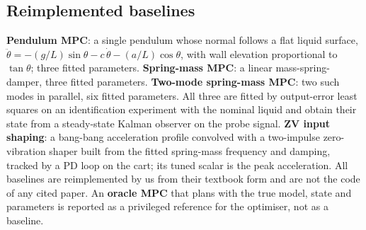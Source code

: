 \subsection{Reimplemented baselines}
\textbf{Pendulum MPC}: a single pendulum whose normal follows a flat liquid surface, $\ddot\theta=-(g/L)\sin\theta-c\,\dot\theta-(a/L)\cos\theta$, with wall elevation proportional to $\tan\theta$; three fitted parameters. \textbf{Spring-mass MPC}: a linear mass-spring-damper, three fitted parameters. \textbf{Two-mode spring-mass MPC}: two such modes in parallel, six fitted parameters. All three are fitted by output-error least squares on an identification experiment with the nominal liquid and obtain their state from a steady-state Kalman observer on the probe signal. \textbf{ZV input shaping}: a bang-bang acceleration profile convolved with a two-impulse zero-vibration shaper built from the fitted spring-mass frequency and damping, tracked by a PD loop on the cart; its tuned scalar is the peak acceleration. All baselines are reimplemented by us from their textbook form and are not the code of any cited paper. An \textbf{oracle MPC} that plans with the true model, state and parameters is reported as a privileged reference for the optimiser, not as a baseline.
